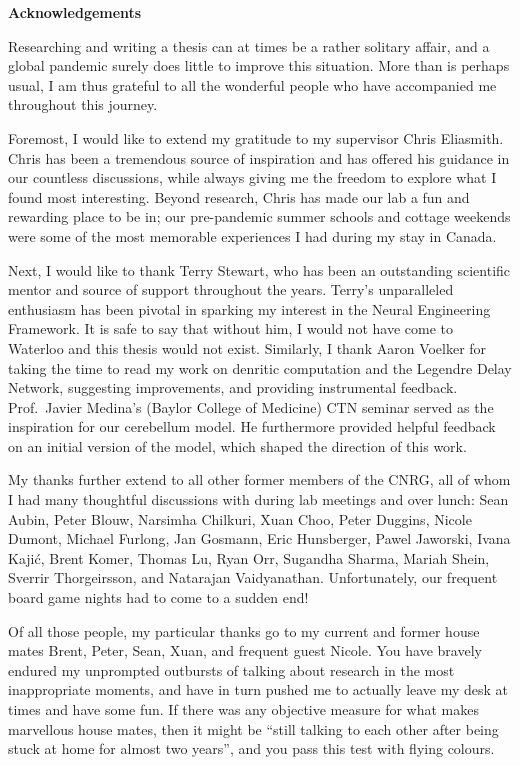\begin{center}\textbf{Acknowledgements}\end{center}

Researching and writing a thesis can at times be a rather solitary affair, and a global pandemic surely does little to improve this situation.
More than is perhaps usual, I am thus grateful to all the wonderful people who have accompanied me throughout this journey.

Foremost, I would like to extend my gratitude to my supervisor Chris Eliasmith.
Chris has been a tremendous source of inspiration and has offered his guidance in our countless discussions, while always giving me the freedom to explore what I found most interesting.
Beyond research, Chris has made our lab a fun and rewarding place to be in; our pre-pandemic summer schools and cottage weekends were some of the most memorable experiences I had during my stay in Canada.

Next, I would like to thank Terry Stewart, who has been an outstanding scientific mentor and source of support throughout the years.
Terry's unparalleled enthusiasm has been pivotal in sparking my interest in the Neural Engineering Framework.
It is safe to say that without him, I would not have come to Waterloo and this thesis would not exist.
Similarly, I thank Aaron Voelker for taking the time to read my work on denritic computation and the Legendre Delay Network, suggesting improvements, and providing instrumental feedback.
Prof.~Javier Medina's (Baylor College of Medicine) CTN seminar served as the inspiration for our cerebellum model.
He furthermore provided helpful feedback on an initial version of the model, which shaped the direction of this work.

My thanks further extend to all other former members of the CNRG, all of whom I had many thoughtful discussions with during lab meetings and over lunch: Sean Aubin, Peter Blouw, Narsimha Chilkuri, Xuan Choo, Peter Duggins, Nicole Dumont, Michael Furlong, Jan Gosmann, Eric Hunsberger, Pawel Jaworski, Ivana Kajić, Brent Komer, Thomas Lu, Ryan Orr, Sugandha Sharma, Mariah Shein, Sverrir Thorgeirsson, and Natarajan Vaidyanathan.
Unfortunately, our frequent board game nights had to come to a sudden end!

Of all those people, my particular thanks go to my current and former house mates Brent, Peter, Sean, Xuan, and frequent guest Nicole.
You have bravely endured my unprompted outbursts of talking about research in the most inappropriate moments, and have in turn pushed me to actually leave my desk at times and have some fun.
If there was any objective measure for what makes marvellous house mates, then it might be \enquote{still talking to each other after being stuck at home for almost two years}, and you pass this test with flying colours.

